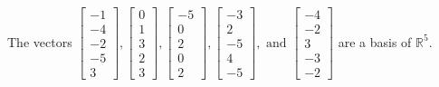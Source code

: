 \begin{exercise}
\begin{exerciseStatement}
  \end{exerciseStatement}
  \begin{exerciseAnswer}
   The vectors \(\left[\begin{array}{r}
-1 \\
-4 \\
-2 \\
-5 \\
3
\end{array}\right] , \left[\begin{array}{r}
0 \\
1 \\
3 \\
2 \\
3
\end{array}\right] , \left[\begin{array}{r}
-5 \\
0 \\
2 \\
0 \\
2
\end{array}\right] , \left[\begin{array}{r}
-3 \\
2 \\
-5 \\
4 \\
-5
\end{array}\right] , \text{ and } \left[\begin{array}{r}
-4 \\
-2 \\
3 \\
-3 \\
-2
\end{array}\right]\) 
  	 are  a basis of \(\mathbb{R}^5\).
  


  \end{exerciseAnswer}
\end{exercise}